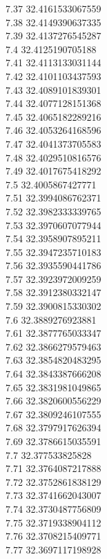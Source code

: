 {7.37	32.4161533067559\\
7.38	32.4149390637335\\
7.39	32.4137276545287\\
7.4	32.4125190705188\\
7.41	32.4113133031144\\
7.42	32.4101103437593\\
7.43	32.4089101839301\\
7.44	32.4077128151368\\
7.45	32.4065182289216\\
7.46	32.4053264168596\\
7.47	32.4041373705583\\
7.48	32.4029510816576\\
7.49	32.4017675418292\\
7.5	32.4005867427771\\
7.51	32.3994086762371\\
7.52	32.3982333339765\\
7.53	32.3970607077944\\
7.54	32.3958907895211\\
7.55	32.3947235710183\\
7.56	32.3935590441786\\
7.57	32.3923972009259\\
7.58	32.3912380332147\\
7.59	32.3900815330302\\
7.6	32.3889276923881\\
7.61	32.3877765033347\\
7.62	32.3866279579463\\
7.63	32.3854820483295\\
7.64	32.3843387666208\\
7.65	32.3831981049865\\
7.66	32.3820600556229\\
7.67	32.3809246107555\\
7.68	32.3797917626394\\
7.69	32.3786615035591\\
7.7	32.377533825828\\
7.71	32.3764087217888\\
7.72	32.3752861838129\\
7.73	32.3741662043007\\
7.74	32.3730487756809\\
7.75	32.3719338904112\\
7.76	32.3708215409771\\
7.77	32.3697117198928\\
}
